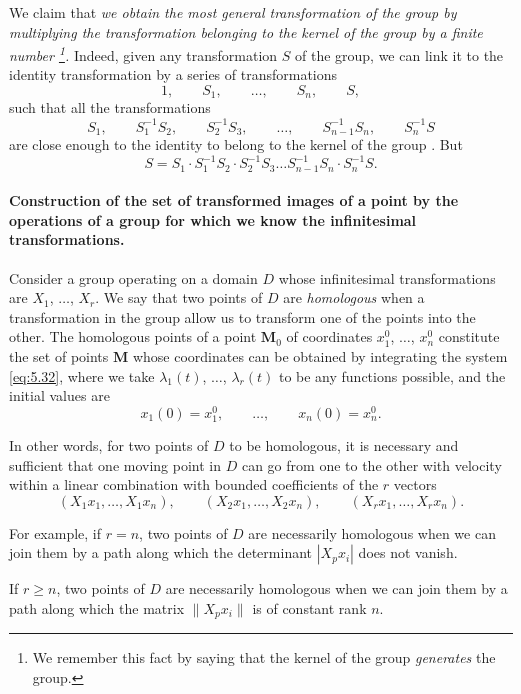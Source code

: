 \documentclass[leqno,11pt]{book}
\numberwithin{equation}{chapter}
\theoremstyle{shape1}
\theoremstyle{shapesmall}
\begin{document}
We claim that \emph{we obtain the most general transformation of the group by multiplying the transformation belonging to the kernel of the group by a finite number \footnote{We remember this fact by saying that the kernel of the group \emph{generates} the group.}.} Indeed, given any transformation $S$ of the group, we can link it to the identity transformation by a series of transformations
\[
1,\qquad S_{1},\qquad \dots,\qquad S_{n},\qquad S,
\]
such that all the transformations
\[
S_{1},\qquad S_{1}^{-1}S_{2},\qquad S_{2}^{-1}S_{3},\qquad \dots,\qquad S_{n-1}^{-1}S_{n},\qquad S_{n}^{-1}S
\]
are close enough to the identity to belong to the kernel of the group \cite{15}. But
\[
S=S_{1}\cdot S_{1}^{-1}S_{2}\cdot S_{2}^{-1}S_{3}\dots S_{n-1}^{-1}S_{n}\cdot S_{n}^{-1}S.
\]

\paragraph{Construction of the set of transformed images of a point by the operations of a group for which we know the infinitesimal transformations.}
\label{sec:87}
Consider a group operating on a domain $D$ whose infinitesimal transformations are $X_{1}$, $\dots$, $X_{r}$. We say that two points of $D$ are \emph{homologous} when a transformation in the group allow us to transform one of the points into the other. The homologous points of a point $\mathbf{M}_{0}$ of coordinates $x_{1}^{0}$, $\dots$, $x_{n}^{0}$ constitute the set of points $\mathbf{M}$ whose coordinates can be obtained by integrating the system \eqref{eq:5.32}, where we take $\lambda_{1}(t)$, $\dots$, $\lambda_{r}(t)$ to be any functions possible, and the initial values are
\[
x_{1}(0)=x_{1}^{0},\qquad\dots,\qquad x_{n}(0)=x_{n}^{0}.
\]

In other words, for two points of $D$ to be homologous, it is necessary and sufficient that one moving point in $D$ can go from one to the other with velocity within a linear combination with bounded coefficients of the $r$ vectors
\begin{equation}
  \label{eq:5.34}
  (X_{1}x_{1},\dots,X_{1}x_{n}),\qquad(X_{2}x_{1},\dots,X_{2}x_{n}),\qquad(X_{r}x_{1},\dots,X_{r}x_{n}).
\end{equation}

For example, if $r=n$, two points of $D$ are necessarily homologous when we can join them by a path along which the determinant $|X_{p}x_{i}|$ does not vanish.

If $r\ge n$, two points of $D$ are necessarily homologous when we can join them by a path along which the matrix $\|X_{p}x_{i}\|$ is of constant rank $n$.
\end{document}
